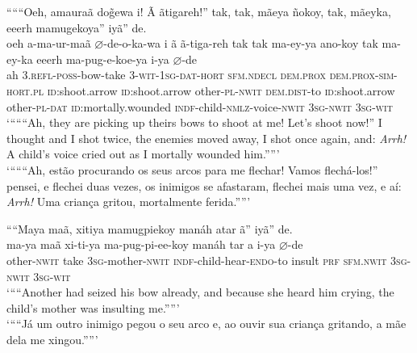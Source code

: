 \documentclass[output=paper,
modfonts,nonflat
]{langsci/langscibook}
\begin{document}
\largerpage[-2]
\ea “““Oeh, amauraã do\~{g}ewa i! Ã ãtigareh!” tak, tak, mãeya ñokoy, tak, mãeyka, eeerh mamugekoya” iyã” de.\\[.3em]
\gll oeh a-ma-ur-maã \(\varnothing\)-de-o-ka-wa i ã ã-tiga-reh{\footnotemark} tak tak ma-ey-ya ano-koy tak ma-ey-ka eeerh ma-pug-e-koe-ya i-ya \(\varnothing\)-de\\
ah \textsc{3.refl-poss}-bow-take \textsc{3-wit-1sg-dat-hort} \textsc{sfm.ndecl} \textsc{dem.prox} \textsc{dem.prox-sim-hort.pl} \textsc{id}:shoot.arrow \textsc{id}:shoot.arrow other-\textsc{pl-nwit} \textsc{dem.dist}-to \textsc{id}:shoot.arrow other-\textsc{pl-dat} \textsc{id}:mortally.wounded \textsc{indf}-child-\textsc{nmlz}-voice-\textsc{nwit} \textsc{3sg-nwit} \textsc{3sg-wit}\\
\glt ‘“““Ah, they are picking up theirs bows to shoot at me! Let's shoot now!” I thought and I shot twice, the enemies moved away, I shot once again, and: \textit{Arrh!} A child's voice cried out as I mortally wounded him.””’\\
\glt ‘“““Ah, estão procurando os seus arcos para me flechar! Vamos flechá-los!” pensei, e flechei duas vezes, os inimigos se afastaram, flechei mais uma vez, e aí: \textit{Arrh!} Uma criança gritou, mortalmente ferida.””’\\
\z

\ea ““Maya maã, xitiya mamugpiekoy manáh atar ã” iyã” de.\\[.3em]
\gll ma-ya maã xi-ti-ya ma-pug-pi-ee-koy{\footnotemark} manáh tar a i-ya \(\varnothing\)-de\\
other-\textsc{nwit} take \textsc{3sg}-mother-\textsc{nwit} \textsc{indf}-child-hear-\textsc{endo}-to insult \textsc{prf} \textsc{sfm.nwit} \textsc{3sg-nwit} \textsc{3sg-wit}\\
\glt ‘““Another had seized his bow already, and because she heard him crying, the child's mother was insulting me.””’{\footnotemark}\\
\glt ‘““Já um outro inimigo pegou o seu arco e, ao ouvir sua criança gritando, a mãe dela me xingou.””’
\fnminus
{}
\fnplus
{}
\z
\end{document}
